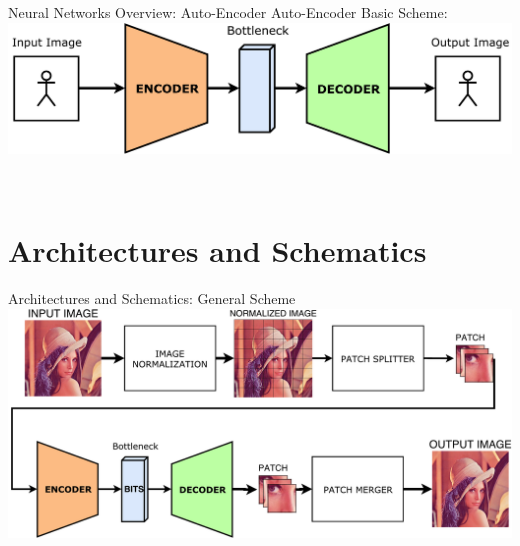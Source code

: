 \documentclass[10pt]{beamer}
\begin{document}
\begin{frame}{Neural Networks Overview: Auto-Encoder}
  \vspace{5mm}
  Auto-Encoder Basic Scheme:\\
  \vspace{5mm}
  \includegraphics[width=\linewidth]{./img/autoencoder1.pdf}
  \vspace{20mm}
  \begin{figure}
    \begin{minipage}{\textwidth}
             \\
    \end{minipage}
\end{figure}
\end{frame}





\begingroup
{}
\section{Architectures and Schematics}
\endgroup

\begin{frame}{Architectures and Schematics: General Scheme}
  \includegraphics[width=\linewidth]{./img/generalScheme.pdf}
\end{frame}
\end{document}

